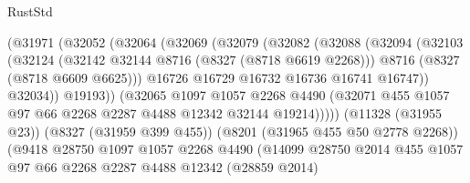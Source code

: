 \begin{lexlean}{RustStd}
\begin{coremodule}
                            (@31971
                              (@32052
                                (@32064
                                  (@32069
                                    (@32079
                                      (@32082
                                        (@32088
                                          (@32094
                                            (@32103
                                              (@32124
                                                (@32142 @32144 @8716 (@8327 (@8718 @6619 @2268)))
                                                @8716
                                                (@8327 (@8718 @6609 @6625)))
                                              @16726
                                              @16729
                                              @16732
                                              @16736
                                              @16741
                                              @16747))
                                          @32034))
                                      @19193))
                                  (@32065
                                    @1097
                                    @1057
                                    @2268
                                    @4490
                                    (@32071
                                      @455
                                      @1057
                                      @97
                                      @66
                                      @2268
                                      @2287
                                      @4488
                                      @12342
                                      @32144
                                      @19214)))))
                            (@11328 (@31955 @23))
                            (@8327 (@31959 @399 @455))
                            (@8201 (@31965 @455 @50 @2778 @2268))
                            (@9418
                              @28750
                              @1097
                              @1057
                              @2268
                              @4490
                              (@14099
                                @28750
                                @2014
                                @455
                                @1057
                                @97
                                @66
                                @2268
                                @2287
                                @4488
                                @12342
                                (@28859 @2014)

\end{coremodule}
\end{lexlean}
